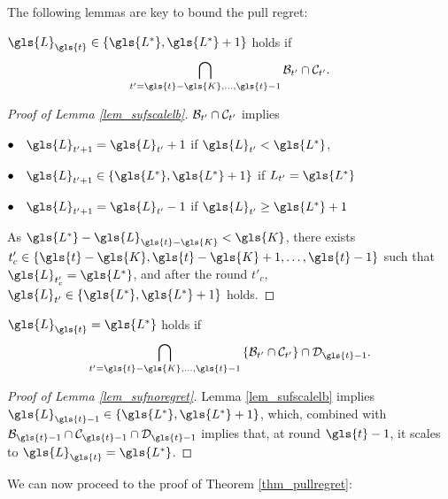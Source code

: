 The following lemmas are key to bound the pull regret: 
\begin{lemma}[Scaling]
	\label{lem_sufscalelb}
	$\gls{L}_{\gls{t}} \in \{\gls{L^*},\gls{L^*}+1\}$ holds if 
	\[
	\bigcap_{t' = \gls{t}-\gls{K},\dots,\gls{t}-1} \mB_{t'} \cap \mC_{t'}. 
	\]
\end{lemma}
\begin{proof}[Proof of Lemma \ref{lem_sufscalelb}]
	$\mathcal{B}_{t'} \cap \mathcal{C}_{t'}$ implies
	
	$\bullet \quad \gls{L}_{t'+1} = \gls{L}_{t'} + 1$ if $\gls{L}_{t'} < \gls{L^*}$, 
	
	$\bullet \quad \gls{L}_{t'+1} \in \{\gls{L^*}, \gls{L^*}+1\}$ if $L_{t'}=\gls{L^*}$
	
	$\bullet \quad \gls{L}_{t'+1} = \gls{L}_{t'} - 1$ if $\gls{L}_{t'} \ge \gls{L^*} + 1$ 
	
	As $\gls{L^*} - \gls{L}_{\gls{t}-\gls{K}} < \gls{K}$, there exists $t'_c \in \{\gls{t}-\gls{K},\gls{t}-\gls{K}+1,\dots,\gls{t}-1\}$ such that $\gls{L}_{t'_c} = \gls{L^*}$, and after the round $t'_c$, $\gls{L}_{t'} \in \{\gls{L^*},\gls{L^*}+1\}$ holds.  
\end{proof}
\begin{lemma}
	\label{lem_sufnoregret}
	$\gls{L}_{\gls{t}} = \gls{L^*}$ holds if 
	\[
	\bigcap_{t' = \gls{t}-\gls{K},\dots,\gls{t}-1} \left\{\mB_{t'} \cap \mC_{t'}\right\} \cap \mD_{\gls{t}-1}.
	\]
\end{lemma}
\begin{proof}[Proof of Lemma \ref{lem_sufnoregret}]
	Lemma \ref{lem_sufscalelb} implies $\gls{L}_{\gls{t}-1} \in \{\gls{L^*},\gls{L^*}+1\}$, which, combined with $\mB_{\gls{t}-1} \cap \mC_{\gls{t}-1} \cap \mD_{\gls{t}-1}$ implies that, at round $\gls{t}-1$, it scales to $\gls{L}_{\gls{t}} = \gls{L^*}$.
\end{proof}
\clearpage
We can now proceed to the proof of Theorem \ref{thm_pullregret}:
